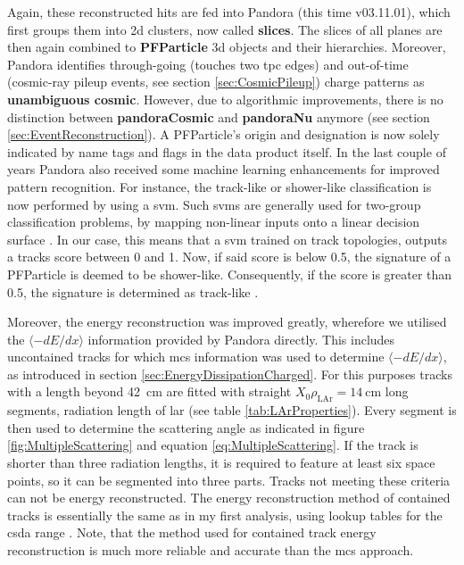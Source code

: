 Again, these reconstructed hits are fed into \gls{Pandora} (this time v03.11.01), which first groups them into \gls{2d} clusters, now called \textbf{slices}. The slices of all planes are then again combined to \textbf{PFParticle} \gls{3d} objects and their hierarchies. Moreover, \gls{Pandora} identifies through-going (touches two \gls{tpc} edges) and out-of-time (cosmic-ray pileup events, see section \ref{sec:CosmicPileup}) charge patterns as \textbf{unambiguous cosmic}. However, due to algorithmic improvements, there is no distinction between \textbf{pandoraCosmic} and \textbf{pandoraNu} anymore (see section \ref{sec:EventReconstruction}). A PFParticle's origin and designation is now solely indicated by name tags and flags in the data product itself. In the last couple of years \gls{Pandora} also received some machine learning enhancements for improved pattern recognition. For instance, the track-like or shower-like classification is now performed by using a \gls{svm}. Such \glspl{svm} are generally used for two-group classification problems, by mapping non-linear inputs onto a linear decision surface \cite{SupportVectorNetworks}. In our case, this means that a \gls{svm} trained on track topologies, outputs a tracks score between \num{0} and \num{1}. Now, if said score is below \num{0.5}, the signature of a PFParticle is deemed to be shower-like. Consequently, if the score is greater than \num{0.5}, the signature is determined as track-like \cite{MicroBooNETrackScoreIN}. 

Moreover, the energy reconstruction was improved greatly, wherefore we utilised the $\langle -dE/dx \rangle$ information provided by \gls{Pandora} directly. This includes uncontained tracks for which \gls{mcs} information was used to determine $\langle -dE/dx \rangle$, as introduced in section \ref{sec:EnergyDissipationCharged}. For this purposes tracks with a length beyond \SI{42}{\centi\metre} are fitted with straight $X_0\rho_\text{LAr} = \SI{14}{\centi\metre}$ long segments, \ie radiation length of \gls{lar} (see table \ref{tab:LArProperties}). Every segment is then used to determine the scattering angle as indicated in figure \ref{fig:MultipleScattering} and equation \ref{eq:MultipleScattering}. If the track is shorter than three radiation lengths, it is required to feature at least six space points, so it can be segmented into three parts. Tracks not meeting these criteria can not be energy reconstructed. The energy reconstruction method of contained tracks is essentially the same as in my first analysis, using lookup tables for the \gls{csda} range \cite{CSDA}. Note, that the method used for contained track energy reconstruction is much more reliable and accurate than the \gls{mcs} approach.

